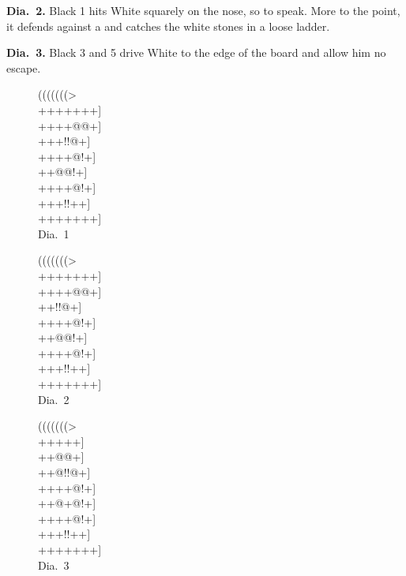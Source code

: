 \documentclass[mcrownvopaper,10pt,twopage,onecolumn,draft,showtrims]{memoir}
\begin{document}
\noindent
\textbf{Dia.\ 2.} Black 1 hits White squarely on the nose, so to speak. More to the
point, it defends against a and catches the white stones in a loose ladder.

\noindent
\textbf{Dia.\ 3.} Black 3 and 5 drive White to the edge of the board and allow
him no escape.

\begin{figure}[ht]
    \begin{minipage}[c]{0.33\linewidth}
        \centering    
        {\gnos%
        (((((((>\\
        +++++++]\\
        ++++@@+]\\
        +++!!@+]\\
        ++++@!+]\\
        ++@@!+]\\
        ++++@!+]\\
        +++!!++]\\
        +++++++]\\
        }
        Dia.\ 1
    \end{minipage}%
    \begin{minipage}[c]{0.33\linewidth}
        \centering    
        {\gnos%
        (((((((>\\
        +++++++]\\
        ++++@@+]\\
        ++{\gnosb{}}!!@+]\\
        ++++@!+]\\
        ++@@!+]\\
        ++++@!+]\\
        +++!!++]\\
        +++++++]\\
        }
        Dia.\ 2
    \end{minipage}%
    \begin{minipage}[c]{0.33\linewidth}
        \centering    
        {\gnos%
        (((((((>\\
        ++{\gnosb{}}{\gnosw{}}+++]\\
        ++{\gnosb{}}{\gnosw{}}@@+]\\
        ++@!!@+]\\
        ++++@!+]\\
        ++@+@!+]\\
        ++++@!+]\\
        +++!!++]\\
        +++++++]\\
        }
        Dia.\ 3
    \end{minipage}%
\end{figure}
\end{document}

